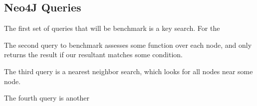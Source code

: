 \subsection{Neo4J Queries}\label{subsec:neo4jQueries}




The first set of queries that will be benchmark is a key search.
For the

The second query to benchmark assesses some function over each node, and only returns the result if our resultant
matches some condition.

The third query is a nearest neighbor search, which looks for all nodes near some node.

The fourth query is another